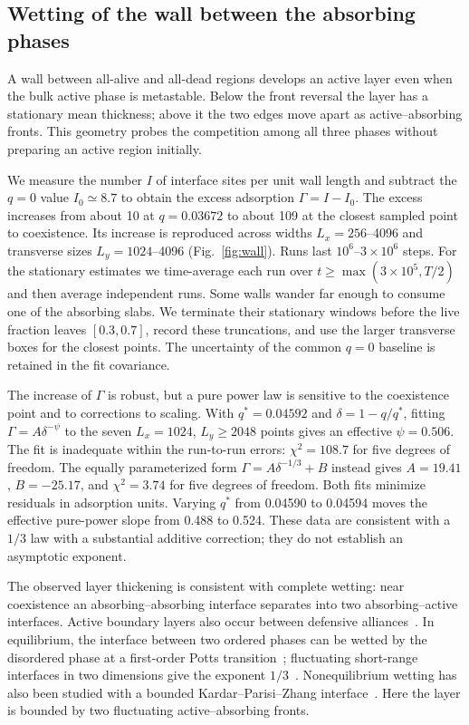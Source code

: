 \subsection{Wetting of the wall between the absorbing phases}
\label{sec:wall}

A wall between all-alive and all-dead regions develops an active layer even when
the bulk active phase is metastable. Below the front reversal the layer has a
stationary mean thickness; above it the two edges move apart as active--absorbing
fronts. This geometry probes the competition among all three phases without
preparing an active region initially.

We measure the number $I$ of interface sites per unit wall length and subtract
the $q=0$ value $I_0\simeq8.7$ to obtain the excess adsorption
$\Gamma=I-I_0$. The excess increases from about 10 at $q=0.03672$ to about
109 at the closest sampled point to coexistence. Its increase is reproduced
across widths $L_x=256$--4096 and transverse sizes $L_y=1024$--4096
(Fig.~\ref{fig:wall}). Runs last $10^6$--$3\times10^6$ steps.
For the stationary estimates we time-average each run over
$t\ge\max(3\times10^5,T/2)$ and then average independent runs.
Some walls wander far enough to consume one of the absorbing slabs. We terminate
their stationary windows before the live fraction leaves $[0.3,0.7]$, record
these truncations, and use the larger transverse boxes for the closest points.
The uncertainty of the common $q=0$ baseline is retained in the fit covariance.

The increase of $\Gamma$ is robust, but a pure power law is sensitive to the
coexistence point and to corrections to scaling. With $q^*=0.04592$ and
$\delta=1-q/q^*$, fitting $\Gamma=A\delta^{-\psi}$ to the seven
$L_x=1024$, $L_y\ge2048$ points gives an effective $\psi=0.506$.
The fit is inadequate within the run-to-run errors: $\chi^2=108.7$ for five
degrees of freedom. The equally parameterized form
$\Gamma=A\delta^{-1/3}+B$ instead gives $A=19.41$, $B=-25.17$, and
$\chi^2=3.74$ for five degrees of freedom. Both fits minimize residuals in
adsorption units. Varying $q^*$ from 0.04590 to 0.04594 moves the effective
pure-power slope from 0.488 to 0.524. These data are consistent with a $1/3$
law with a substantial additive correction; they do not establish an
asymptotic exponent.

The observed layer thickening is consistent with complete wetting: near
coexistence an absorbing--absorbing interface separates into two
absorbing--active interfaces. Active boundary layers also occur between
defensive alliances~\cite{szabo2007}. In equilibrium, the interface between two
ordered phases can be wetted by the disordered phase at a first-order Potts
transition~\cite{selke1983,carlon1999}; fluctuating short-range interfaces in
two dimensions give the exponent $1/3$~\cite{lipowsky1983,fisher1984,carlon1999}.
Nonequilibrium wetting has also been studied with a bounded
Kardar--Parisi--Zhang interface~\cite{hinrichsen1997wet,munoz1998,delossantos2003}.
Here the layer is bounded by two fluctuating active--absorbing fronts.

